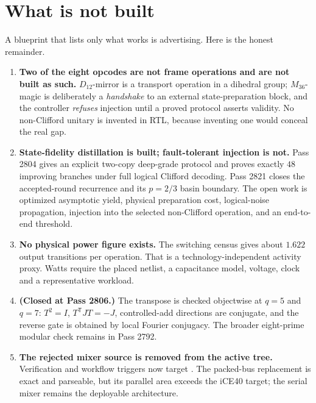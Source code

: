 \section{What is not built}

\begin{plain}
A blueprint that lists only what works is advertising. Here is the honest remainder.
\end{plain}

\begin{enumerate}[leftmargin=*,itemsep=3pt]
\item \textbf{Two of the eight opcodes are not frame operations and are not built as
      such.} $D_{12}$-mirror is a transport operation in a dihedral group; $M_{36}$-magic
      is deliberately a \emph{handshake} to an external state-preparation block, and the
      controller \emph{refuses} injection until a proved protocol asserts validity. No
      non-Clifford unitary is invented in RTL, because inventing one would conceal the
      real gap.
\item \textbf{State-fidelity distillation is built; fault-tolerant injection is not.}
      Pass 2804 gives an explicit two-copy deep-grade protocol and proves exactly $48$
      improving branches under full logical Clifford decoding. Pass 2821 closes the
      accepted-round recurrence and its $p=2/3$ basin boundary. The open work is optimized
      asymptotic yield, physical preparation cost, logical-noise propagation, injection
      into the selected non-Clifford operation, and an end-to-end threshold.
\item \textbf{No physical power figure exists.} The switching census gives about $1.622$
      output transitions per operation. That is a technology-independent activity proxy.
      Watts require the placed netlist, a capacitance model, voltage, clock and a
      representative workload.
\item \textbf{(Closed at Pass 2806.)} The transpose is checked objectwise at
      $q=5$ and $q=7$: $T^2=I$, $T^{\mathsf T}JT=-J$, controlled-add directions are
      conjugate, and the reverse gate is obtained by local Fourier conjugacy. The broader
      eight-prime modular check remains in Pass 2792.
\item \textbf{The rejected mixer source is removed from the active tree.}
      Verification and workflow triggers now target
      . The packed-bus replacement is
      exact and parseable, but its parallel area exceeds the iCE40 target; the serial
      mixer remains the deployable architecture.
\end{enumerate}
